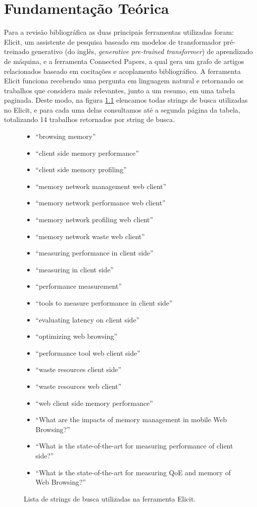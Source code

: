 \documentclass[12pt]{tcc}
\begin{document}
\chapter{Fundamentação Teórica}
\label{cap:fund_teorica}

Para a revisão bibliográfica as duas principais ferramentas utilizadas foram: Elicit, um assistente de pesquisa baseado em modelos de transformador pré-treinado generativo (do inglês, \emph{generative pre-trained transformer}) de aprendizado de máquina, e a ferramenta Connected Papers, a qual  gera um grafo de artigos relacionados baseado em cocitações e acoplamento bibliográfico.
A ferramenta Elicit funciona recebendo uma pergunta em linguagem natural e retornando os trabalhos que considera mais relevantes, junto a um resumo, em uma tabela paginada.
Deste modo, na figura \ref{fig:elicit} elencamos todas strings de busca utilizadas no Elicit, e para cada uma delas consultamos até a segunda página da tabela, totalizando 14 trabalhos retornados por string de busca.

\begin{figure}
	\centering
	\caption{Lista de strings de busca utilizadas na ferramenta Elicit.}
	\begin{minipage}{0.6\textwidth}
	    \begin{itemize}
			\item ``browsing memory''
			\item ``client side memory performance''
			\item ``client side memory profiling''
			\item ``memory network management web client''
			\item ``memory network performance web client''
			\item ``memory network profiling web client''
			\item ``memory network waste web client''
			\item ``measuring performance in client side''
			\item ``measuring in client side''
			\item ``performance measurement''
			\item ``tools to measure performance in client side''
			\item ``evaluating latency on client side''
			\item ``optimizing web browsing''
			\item ``performance tool web client side''
			\item ``waste resources client side''
			\item ``waste resources web client''
			\item ``web client side memory performance''
			\item ``What are the impacts of memory management in mobile Web Browsing?''
			\item ``What is the state-of-the-art for measuring performance of client side?''
			\item ``What is the state-of-the-art for measuring QoE and memory of Web Browsing?''
	    \end{itemize}
	\end{minipage}
	\label{fig:elicit}
\end{figure}
\end{document}
